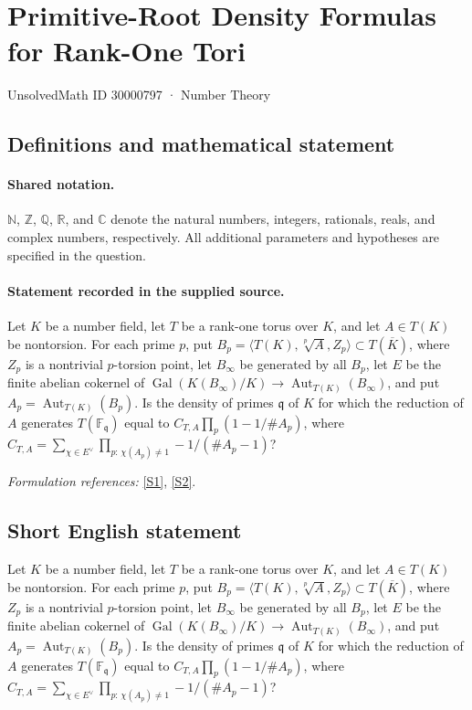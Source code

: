 \documentclass[11pt]{article}
\newcommand{\sref}[2]{\hyperlink{source:#1:#2}{[S#2]}}
\begin{document}
\setcounter{section}{30000796}
\section{Primitive-Root Density Formulas for Rank-One Tori}\label{30000797}
{\small UnsolvedMath ID 30000797 · Number Theory}
\subsection{Definitions and mathematical statement}

\paragraph{Shared notation.}$\mathbb N$, $\mathbb Z$, $\mathbb Q$, $\mathbb R$, and $\mathbb C$ denote the natural numbers, integers, rationals, reals, and complex numbers, respectively. All additional parameters and hypotheses are specified in the question.


\paragraph{Statement recorded in the supplied source.}
Let $K$ be a number field, let $T$ be a rank-one torus over $K$, and let $A\in T(K)$ be nontorsion. For each prime $p$, put $B_p=\langle T(K),\sqrt[p]{A},Z_p\rangle\subset T(\overline K)$, where $Z_p$ is a nontrivial $p$-torsion point, let $B_\infty$ be generated by all $B_p$, let $E$ be the finite abelian cokernel of $\operatorname{Gal}(K(B_\infty)/K)\to\operatorname{Aut}_{T(K)}(B_\infty)$, and put $A_p=\operatorname{Aut}_{T(K)}(B_p)$. Is the density of primes $\mathfrak q$ of $K$ for which the reduction of $A$ generates $T(\mathbb F_{\mathfrak q})$ equal to $C_{T,A}\prod_p(1-1/\#A_p)$, where $C_{T,A}=\sum_{\chi\in E^\vee}\prod_{p:\,\chi(A_p)\neq1}-1/(\#A_p-1)$?
\par\smallskip\textit{Formulation references:} \sref{30000797}{1}, \sref{30000797}{2}.
\subsection{Short English statement}
Let $K$ be a number field, let $T$ be a rank-one torus over $K$, and let $A\in T(K)$ be nontorsion. For each prime $p$, put $B_p=\langle T(K),\sqrt[p]{A},Z_p\rangle\subset T(\overline K)$, where $Z_p$ is a nontrivial $p$-torsion point, let $B_\infty$ be generated by all $B_p$, let $E$ be the finite abelian cokernel of $\operatorname{Gal}(K(B_\infty)/K)\to\operatorname{Aut}_{T(K)}(B_\infty)$, and put $A_p=\operatorname{Aut}_{T(K)}(B_p)$. Is the density of primes $\mathfrak q$ of $K$ for which the reduction of $A$ generates $T(\mathbb F_{\mathfrak q})$ equal to $C_{T,A}\prod_p(1-1/\#A_p)$, where $C_{T,A}=\sum_{\chi\in E^\vee}\prod_{p:\,\chi(A_p)\neq1}-1/(\#A_p-1)$?
\end{document}
